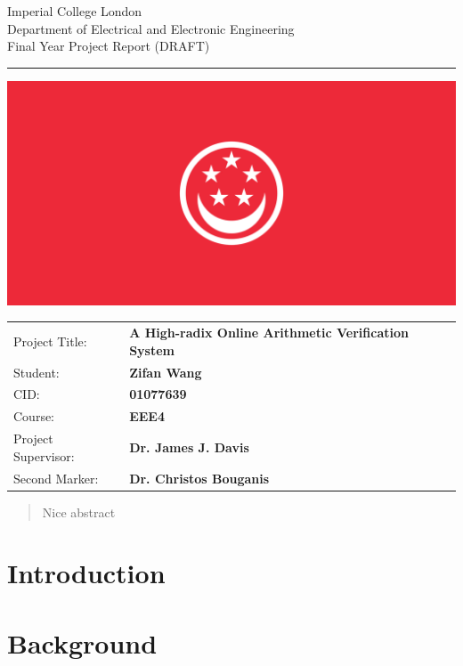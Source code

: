 \documentclass[12pt]{article}
\begin{document}
\begin{titlepage}
  \setlength{\parindent}{0pt}
  \setlength{\parskip}{0pt}

  { \Large
    Imperial College London\\[17pt]
    Department of Electrical and Electronic Engineering\\[17pt]
    Final Year Project Report (DRAFT)
  }

  \rule{\columnwidth}{3pt}
  \vfill
  \centering
  \includegraphics[width=0.8\columnwidth]{img/placeholder.png}
  \vfill

  \begin{table}[h]
  \def\arraystretch{1.8}
    \begin{tabular}{p{40mm}p{\dimexpr\columnwidth-40mm}}
      Project Title: & \textbf{A High-radix Online Arithmetic Verification System} \\
      Student:       & \textbf{Zifan Wang} \\
      CID:           & \textbf{01077639} \\
      Course:        & \textbf{EEE4} \\
      Project Supervisor: & \textbf{Dr. James J. Davis} \\
      Second Marker: & \textbf{Dr. Christos Bouganis}
    \end{tabular}
  \end{table}
\end{titlepage}


\setcounter{tocdepth}{2}
\tableofcontents

\newpage

\begin{abstract}
  Nice abstract
\end{abstract}

\section{Introduction}
\section{Background}
  
\end{document}
